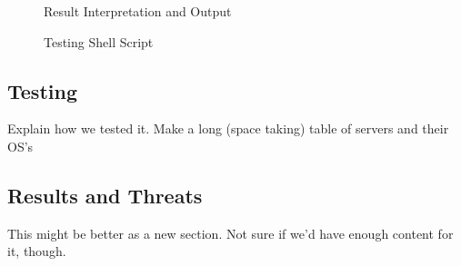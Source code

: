 \begin{figure}[p]
	\caption{\label{fig:results} Result Interpretation and Output}
\end{figure}

\begin{figure}[p]
	\caption{\label{fig:testScript} Testing Shell Script}
\end{figure}

\subsection{Testing}
Explain how we tested it. Make a long (space taking) table of servers and their OS's

\subsection{Results and Threats}
This might be better as a new section. Not sure if we'd have enough content for it, though.